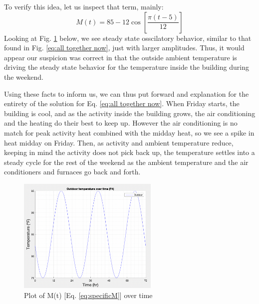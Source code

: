 \documentclass[titlepage]{article}
\begin{document}
To verify this idea, let us inspect that term, mainly:
\begin{equation}\label{eq:specificM}
    M(t) = 85 - 12\cos\left[\frac{\pi(t-5)}{12}\right]
\end{equation}
Looking at Fig. \ref{fig:specificM} below, we see steady state osscilatory behavior, similar to that found in
Fig. \ref{eq:all together now}, just with larger amplitudes. Thus, it would appear our suspicion was correct
in that the outside ambient temperature is driving the steady state behavior for the temperature inside the building 
during the weekend.

Using these facts to inform us, we can thus put forward and explanation for the entirety of the solution for
Eq. \eqref{eq:all together now}. When Friday starts, the building is cool, and as the 
activity inside the building grows, the air conditioning and the heating do their best to keep up.
However the air conditioning is no match for peak activity heat combined with the midday heat,
so we see a spike in heat midday  on Friday. Then, as activity and ambient temperature reduce, keeping
in mind the activity does not pick back up, the temperature settles into a steady cycle for the rest of the
weekend as the ambient temperature and the air conditioners and furnaces go back and forth.

\begin{figure}[H]
    \centering
    \includegraphics[width=0.6\textwidth]{./images/specificM.png}
    \caption{Plot of M(t) [Eq. \eqref{eq:specificM}] over time}
    \label{fig:specificM}
\end{figure}


\end{document}
